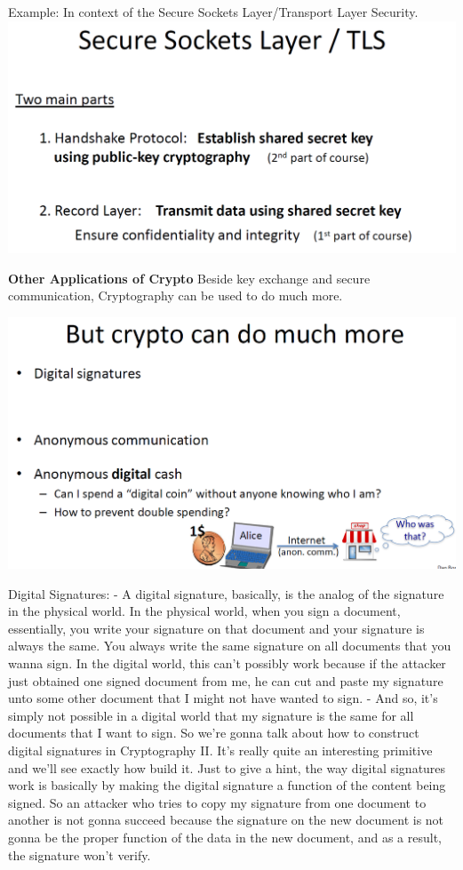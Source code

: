 \documentclass[11pt]{article}
\makeatletter
\def\maxwidth{\ifdim\Gin@nat@width>\linewidth\linewidth
    \else\Gin@nat@width\fi}
\let\Oldincludegraphics\includegraphics
\renewcommand{\includegraphics}[1]{\Oldincludegraphics[width=.8\maxwidth]{#1}}
\makeatother
\begin{document}
Example: In context of the Secure Sockets Layer/Transport Layer
Security. \includegraphics{./Images/TwoMainParts.png}

\textbf{Other Applications of Crypto} Beside key exchange and secure
communication, Cryptography can be used to do much more.

\includegraphics{./Images/MuchMoreViaCrypto.png}

Digital Signatures: - A digital signature, basically, is the analog of
the signature in the physical world. In the physical world, when you
sign a document, essentially, you write your signature on that document
and your signature is always the same. You always write the same
signature on all documents that you wanna sign. In the digital world,
this can't possibly work because if the attacker just obtained one
signed document from me, he can cut and paste my signature unto some
other document that I might not have wanted to sign. - And so, it's
simply not possible in a digital world that my signature is the same for
all documents that I want to sign. So we're gonna talk about how to
construct digital signatures in Cryptography II. It's really quite an
interesting primitive and we'll see exactly how build it. Just to give a
hint, the way digital signatures work is basically by making the digital
signature a function of the content being signed. So an attacker who
tries to copy my signature from one document to another is not gonna
succeed because the signature on the new document is not gonna be the
proper function of the data in the new document, and as a result, the
signature won't verify.
\end{document}
